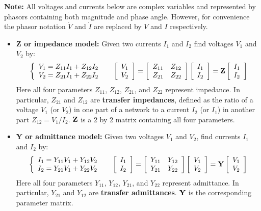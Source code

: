 \begin{itemize}
{\bf Note: } All voltages and currents below are complex variables and
represented by phasors containing both magnitude and phase angle. However, 
for convenience the phasor notation $\dot{V}$ and $\dot{I}$ are replaced by 
$V$ and $I$ respectively.


\begin{itemize}
\item {\bf Z or impedance model:} Given two currents $I_1$ and $I_2$ 
  find voltages $V_1$ and $V_2$ by:
  \[ \left\{ \begin{array}{l} V_1=Z_{11}I_1+Z_{12}I_2 \\
    V_2=Z_{21}I_1+Z_{22}I_2 \end{array} \right.\;\;\;\;\;
  \left[ \begin{array}{l} V_1 \\ V_2\end{array} \right]=
  \left[ \begin{array}{ll} Z_{11} & Z_{12}\\Z_{21} & Z_{22}\end{array}\right]
  \left[ \begin{array}{l} I_1 \\ I_2\end{array} \right]
  ={\bf Z}\left[ \begin{array}{l} I_1 \\ I_2\end{array} \right] \]
  Here all four parameters $Z_{11}$, $Z_{12}$, $Z_{21}$, and $Z_{22}$ represent
  impedance. In particular, $Z_{21}$ and $Z_{12}$ are {\bf transfer impedances}, 
  defined as the ratio of a voltage $V_1$ (or $V_2$) in one part of a network to 
  a current $I_2$ (or $I_1$) in another part $Z_{12}=V_1/I_2$. ${\bf Z}$ is a 2 
  by 2 matrix containing all four parameters.

\item {\bf Y or admittance model:} Given two voltages $V_1$ and $V_2$,
  find currents $I_1$ and $I_2$ by:
  \[ \left\{ \begin{array}{l} I_1=Y_{11}V_1+Y_{12}V_2 \\
    I_2=Y_{21}V_1+Y_{22}V_2 \end{array} \right.\;\;\;\;\;
  \left[ \begin{array}{l} I_1 \\ I_2\end{array} \right]=
  \left[ \begin{array}{ll} Y_{11} & Y_{12}\\Y_{21} & Y_{22}\end{array}\right]
  \left[ \begin{array}{l} V_1 \\ V_2\end{array} \right]
  ={\bf Y}\left[ \begin{array}{l} V_1 \\ V_2\end{array} \right]  \]
  Here all four parameters $Y_{11}$, $Y_{12}$, $Y_{21}$, and $Y_{22}$ represent
  admittance. In particular, $Y_{21}$ and $Y_{12}$ are {\bf transfer admittances}. 
  ${\bf Y}$ is the corresponding parameter matrix.


\end{itemize}
\end{itemize}
